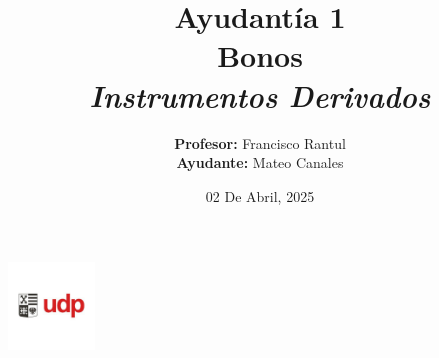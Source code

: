 \documentclass{beamer}
\title{Ayudantía 1 \\ Bonos \\ \large\textit{Instrumentos Derivados}}
\author{
  \texorpdfstring{
    \textbf{Profesor:} Francisco Rantul \\[0.3em]
    \textbf{Ayudante:} Mateo Canales
  }{Profesor: Francisco Rantul, Ayudante: Mateo Canales}
}
\institute{Universidad Diego Portales}
\date{02 De Abril, 2025}
\begin{document}
\begin{frame}
    \titlepage
    \vfill
    \centering
    \includegraphics[width=2.3118cm]{../imagenes/logo.png}
  \end{frame}

\newcommand{\Nominal}{100}    %
\newcommand{\Fseis}{94}     %
\newcommand{\Funo}{89}      %

\newcommand{\PunoCinco}{94.84}  %
\newcommand{\Pdos}{97.12}       %

\newcommand{\CunoCinco}{4}  %
\newcommand{\Cdos}{5}       %

\newcommand{\Tseis}{0.5}
\newcommand{\Tuno}{1.0}
\newcommand{\TunoCinco}{1.5}
\newcommand{\Tdos}{2.0}

\newcommand{\Ffinal}{104}
\newcommand{\FfinalDos}{105}

\newcommand{\entero}[1]{\pgfmathprintnumber[fixed, precision=0]{#1}}
\newcommand{\decimal}[1]{\pgfmathprintnumber[fixed, precision=2]{#1}}
\newcommand{\decimalx}[1]{\pgfmathprintnumber[fixed, precision=3]{#1}}
\newcommand{\decimalxx}[1]{\pgfmathprintnumber[fixed, precision=4]{#1}}
\newcommand{\porcentaje}[1]{%
  \pgfmathsetmacro{\temp}{#1*100}%
  \pgfmathprintnumber[fixed, precision=2]{\temp}\%%
  }

\end{document}
